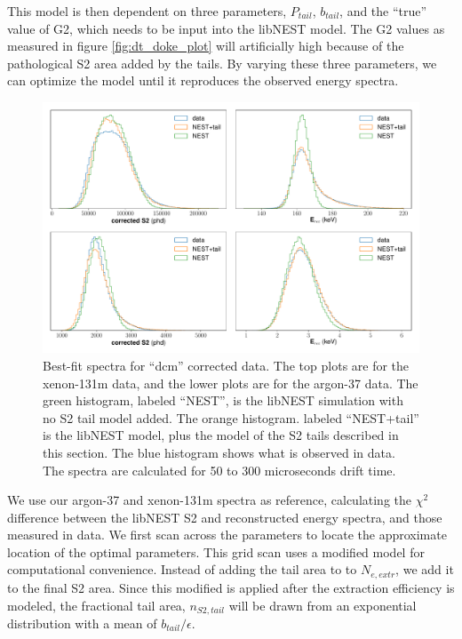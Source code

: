 This model is then dependent on three parameters, $P_{tail}$, $b_{tail}$, and the ``true'' value of G2, which needs to be input into the libNEST model. The G2 values as measured in figure \ref{fig:dt_doke_plot} will artificially high because of the pathological S2 area added by the tails. By varying these three parameters, we can optimize the model until it reproduces the observed energy spectra. 
\begin{figure}[h!]
  \centering
  \includegraphics[width=\textwidth]{Figures/S2tail_hists_dcm.pdf}
\caption{Best-fit spectra for ``dcm'' corrected data.  The top plots are for the xenon-131m data, and the lower plots are for the argon-37 data. The green histogram, labeled ``NEST'', is the libNEST simulation with no S2 tail model added. The orange histogram. labeled ``NEST+tail'' is the libNEST model, plus the model of the S2 tails described in this section. The blue histogram shows what is observed in data. The spectra are calculated for 50 to 300 microseconds drift time. }
\label{fig:s2bestfit_spec_dcm}
\end{figure}


We use our argon-37 and xenon-131m spectra as reference, calculating the $\chi^2$ difference between the libNEST S2 and reconstructed energy spectra, and those measured in data. We first scan across the parameters to locate the approximate location of the optimal parameters. This grid scan uses a modified model for computational convenience. Instead of adding the tail area to to $N_{e,extr}$, we add it to the final S2 area. Since this modified is applied after the extraction efficiency is modeled, the fractional tail area, $n_{S2,tail}$ will be drawn from an exponential distribution with a mean of $b_{tail}/\epsilon$.

